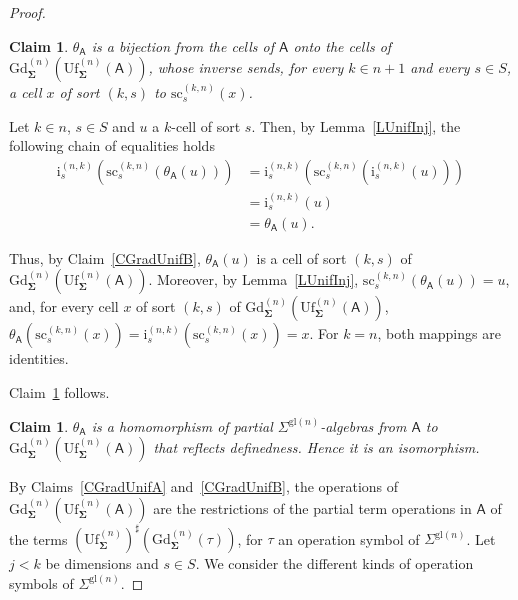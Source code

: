 \documentclass[a4paper, reqno
]{amsart}
\newcommand{\sig}[1]{\mathbf{#1}}             %
\newcommand{\calg}[1]{\boldsymbol{\mathsf{#1}}} %
\newcommand{\gl}{\mathrm{gl}}                %
\newcommand{\src}{\mathrm{sc}}
\newcommand{\Gd}{\mathrm{Gd}}
\newcommand{\Uf}{\mathrm{Uf}}
\theoremstyle{plain}
\newtheorem{claim}[theorem]{Claim}
\theoremstyle{definition}
\begin{document}
\begin{proof}
\begin{claim}\label{CGradUnifC}
$\theta_{\calg{A}}$ is a bijection from the cells of $\calg{A}$ onto the cells of $\Gd^{(n)}_{\sig{\Sigma}}(\Uf^{(n)}_{\sig{\Sigma}}(\calg{A}))$, whose inverse sends, for every $k\in n+1$ and every $s\in S$, a cell $x$ of sort $(k,s)$ to $\src^{(k,n)}_{s}(x)$.
\end{claim}

Let $k\in n$, $s\in S$ and $u$ a $k$-cell of sort $s$.
Then, by Lemma~\ref{LUnifInj}, the following chain of equalities holds
\begin{align*}
\mathrm{i}^{(n,k)}_{s}\left(\src^{(k,n)}_{s}\left(\theta_{\calg{A}}(u)\right)\right)
&=
\mathrm{i}^{(n,k)}_{s}\left(\src^{(k,n)}_{s}\left(\mathrm{i}^{(n,k)}_{s}(u)\right)\right)
\tag{1}
\\&=
\mathrm{i}^{(n,k)}_{s}(u)
\tag{2}
\\&=
\theta_{\calg{A}}(u).
\tag{3}
\end{align*}

Thus, by Claim~\ref{CGradUnifB}, $\theta_{\calg{A}}(u)$ is a cell of sort $(k,s)$ of $\Gd^{(n)}_{\sig{\Sigma}}(\Uf^{(n)}_{\sig{\Sigma}}(\calg{A}))$.
Moreover, by Lemma~\ref{LUnifInj}, $\src^{(k,n)}_{s}(\theta_{\calg{A}}(u))=u$, and, for every cell $x$ of sort $(k,s)$ of $\Gd^{(n)}_{\sig{\Sigma}}(\Uf^{(n)}_{\sig{\Sigma}}(\calg{A}))$, $\theta_{\calg{A}}(\src^{(k,n)}_{s}(x))=\mathrm{i}^{(n,k)}_{s}(\src^{(k,n)}_{s}(x))=x$.
For $k=n$, both mappings are identities.

Claim~\ref{CGradUnifC} follows.

\begin{claim}\label{CGradUnifD}
$\theta_{\calg{A}}$ is a homomorphism of partial $\Sigma^{\gl(n)}$-algebras from $\calg{A}$ to $\Gd^{(n)}_{\sig{\Sigma}}(\Uf^{(n)}_{\sig{\Sigma}}(\calg{A}))$ that reflects definedness.
Hence it is an isomorphism.
\end{claim}

By Claims~\ref{CGradUnifA} and~\ref{CGradUnifB}, the operations of $\Gd^{(n)}_{\sig{\Sigma}}(\Uf^{(n)}_{\sig{\Sigma}}(\calg{A}))$ are the restrictions of the partial term operations in $\calg{A}$ of the terms $(\Uf^{(n)}_{\sig{\Sigma}})^{\sharp}(\Gd^{(n)}_{\sig{\Sigma}}(\tau))$, for $\tau$ an operation symbol of $\Sigma^{\gl(n)}$.
Let $j<k$ be dimensions and $s\in S$.
We consider the different kinds of operation symbols of $\Sigma^{\gl(n)}$.


\end{proof}
\end{document}
